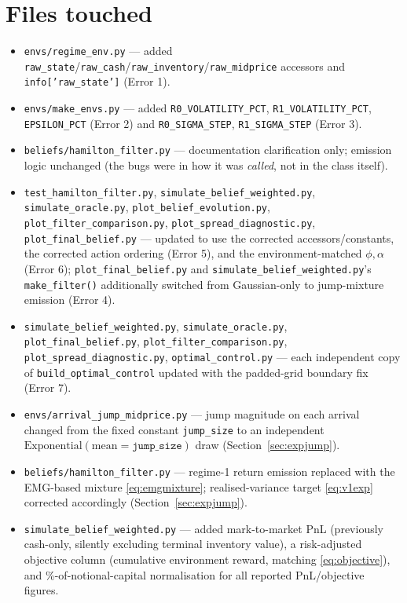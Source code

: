 \documentclass[11pt]{article}
\begin{document}
\section{Files touched}

\begin{itemize}
\item \texttt{envs/regime\_env.py} --- added \texttt{raw\_state}/\texttt{raw\_cash}/\texttt{raw\_inventory}/\texttt{raw\_midprice} accessors and \texttt{info['raw\_state']} (Error 1).
\item \texttt{envs/make\_envs.py} --- added \texttt{R0\_VOLATILITY\_PCT}, \texttt{R1\_VOLATILITY\_PCT}, \texttt{EPSILON\_PCT} (Error 2) and \texttt{R0\_SIGMA\_STEP}, \texttt{R1\_SIGMA\_STEP} (Error 3).
\item \texttt{beliefs/hamilton\_filter.py} --- documentation clarification only; emission logic unchanged (the bugs were in how it was \emph{called}, not in the class itself).
\item \texttt{test\_hamilton\_filter.py}, \texttt{simulate\_belief\_weighted.py}, \texttt{simulate\_oracle.py}, \texttt{plot\_belief\_evolution.py}, \texttt{plot\_filter\_comparison.py}, \texttt{plot\_spread\_diagnostic.py}, \texttt{plot\_final\_belief.py} --- updated to use the corrected accessors/constants, the corrected action ordering (Error 5), and the environment-matched $\phi,\alpha$ (Error 6); \texttt{plot\_final\_belief.py} and \texttt{simulate\_belief\_weighted.py}'s \texttt{make\_filter()} additionally switched from Gaussian-only to jump-mixture emission (Error 4).
\item \texttt{simulate\_belief\_weighted.py}, \texttt{simulate\_oracle.py}, \texttt{plot\_final\_belief.py}, \texttt{plot\_filter\_comparison.py}, \texttt{plot\_spread\_diagnostic.py}, \texttt{optimal\_control.py} --- each independent copy of \texttt{build\_optimal\_control} updated with the padded-grid boundary fix (Error 7).
\item \texttt{envs/arrival\_jump\_midprice.py} --- jump magnitude on each arrival changed from the fixed constant \texttt{jump\_size} to an independent $\mathrm{Exponential}(\text{mean}=\texttt{jump\_size})$ draw (Section~\ref{sec:expjump}).
\item \texttt{beliefs/hamilton\_filter.py} --- regime-1 return emission replaced with the EMG-based mixture \eqref{eq:emgmixture}; realised-variance target \eqref{eq:v1exp} corrected accordingly (Section~\ref{sec:expjump}).
\item \texttt{simulate\_belief\_weighted.py} --- added mark-to-market PnL (previously cash-only, silently excluding terminal inventory value), a risk-adjusted objective column (cumulative environment reward, matching \eqref{eq:objective}), and \%-of-notional-capital normalisation for all reported PnL/objective figures.

\end{itemize}
\end{document}
